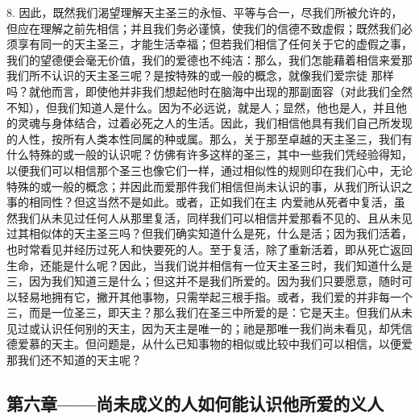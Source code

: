 8. 因此，既然我们渴望理解天主圣三的永恒、平等与合一，尽我们所被允许的，但应在理解之前先相信；并且我们务必谨慎，使我们的信德不致虚假；既然我们必须享有同一的天主圣三，才能生活幸福；但若我们相信了任何关于它的虚假之事，我们的望德便会毫无价值，我们的爱德也不纯洁：那么，我们怎能藉着相信来爱那我们所不认识的天主圣三呢？是按特殊的或一般的概念，就像我们爱宗徒  那样吗？就他而言，即使他并非我们想起他时在脑海中出现的那副面容（对此我们全然不知），但我们知道人是什么。因为不必远说，就是人；显然，他也是人，并且他的灵魂与身体结合，过着必死之人的生活。因此，我们相信他具有我们自己所发现的人性，按所有人类本性同属的种或属。那么，关于那至卓越的天主圣三，我们有什么特殊的或一般的认识呢？仿佛有许多这样的圣三，其中一些我们凭经验得知，以便我们可以相信那个圣三也像它们一样，通过相似性的规则印在我们心中，无论特殊的或一般的概念；并因此而爱那件我们相信但尚未认识的事，从我们所认识之事的相同性？但这当然不是如此。或者，正如我们在主  内爱祂从死者中复活，虽然我们从未见过任何人从那里复活，同样我们可以相信并爱那看不见的、且从未见过其相似体的天主圣三吗？但我们确实知道什么是死，什么是活；因为我们活着，也时常看见并经历过死人和快要死的人。至于复活，除了重新活着，即从死亡返回生命，还能是什么呢？因此，当我们说并相信有一位天主圣三时，我们知道什么是三，因为我们知道三是什么；但这并不是我们所爱的。因为我们只要愿意，随时可以轻易地拥有它，撇开其他事物，只需举起三根手指。或者，我们爱的并非每一个三，而是一位圣三，即天主？那么我们在圣三中所爱的是：它是天主。但我们从未见过或认识任何别的天主，因为天主是唯一的；祂是那唯一我们尚未看见，却凭信德爱慕的天主。但问题是，从什么已知事物的相似或比较中我们可以相信，以便爱那我们还不知道的天主呢？\par


\subsection{第六章——尚未成义的人如何能认识他所爱的义人}

